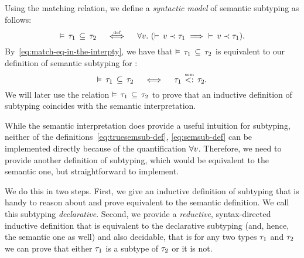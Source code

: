 Using the matching relation, we define a \emph{syntactic model} of
semantic subtyping as follows:
\begin{equation}\label{eq:semsub-def}
\bjsemsub{\ty_1}{\ty_2} \quad \defsign \quad
\forall \vty.\ (\bjmtch{\vty}{\ty_1} \implies\ \bjmtch{\vty}{\ty_1}).
\end{equation}
By~\eqref{eq:match-eq-in-the-interpty}, we have that $\vDash \, \tau_1 \, \subseteq \, \tau_2$
is equivalent to our definition of semantic subtyping for \BetaJulia:
\begin{equation}
\bjsemsub{\ty_1}{\ty_2} \quad \iff \quad \bjtruesemsub{\ty_1}{\ty_2}.
\end{equation}
We will later use the relation $\vDash \, \tau_1 \, \subseteq \, \tau_2$
to prove that an inductive definition of subtyping coincides
with the semantic interpretation.

While the semantic interpretation does provide a useful intuition for subtyping,
neither of the definitions~\eqref{eq:truesemsub-def}, \eqref{eq:semsub-def} 
can be implemented directly because of the quantification $\forall v$.
Therefore, we need to provide another definition of subtyping, which would
be equivalent to the semantic one, but straightforward to implement.

We do this in two steps. 
First, we give an inductive definition of subtyping that is 
handy to reason about and prove equivalent to the semantic definition.
We call this subtyping \emph{declarative}.
Second, we provide a \emph{reductive}, syntax-directed inductive definition that is equivalent to the declarative subtyping 
(and, hence, the semantic one as well)
and also decidable, that is for any two types $\tau_1$ and $\tau_2$
we can prove that either $\tau_1$ is a subtype of $\tau_2$ or it is not.
